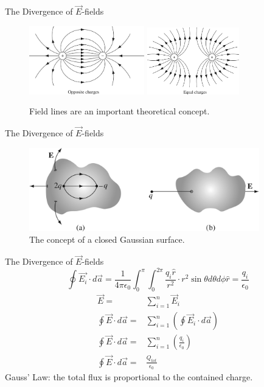 \documentclass{beamer}
\begin{document}
\begin{frame}{The Divergence of $\vec{E}$-fields}
\begin{figure}
\centering
\includegraphics[width=5cm]{figures/2_13.jpg}
\includegraphics[width=4cm]{figures/2_14.jpg}
\caption{\label{fig:fieldLines} Field lines are an important theoretical concept.}
\end{figure}
\end{frame}

\begin{frame}{The Divergence of $\vec{E}$-fields}
\begin{figure}
\centering
\includegraphics[width=10cm]{figures/2_16.jpg}
\caption{\label{fig:fieldLines2} The concept of a closed Gaussian surface.}
\end{figure}
\end{frame}

\begin{frame}{The Divergence of $\vec{E}$-fields}
\begin{equation}
\boxed{
\oint \vec{E_i} \cdot d\vec{a} = \frac{1}{4\pi \epsilon_0} \int_0^{\pi} \int_0^{2\pi} \frac{q_i\hat{r}}{r^2} \cdot r^2 \sin\theta d\theta d\phi \hat{r} = \frac{q_i}{\epsilon_0}
}
\end{equation}
\begin{align}
\vec{E} =& \sum_{i=1}^n \vec{E}_i \\
\oint \vec{E} \cdot d\vec{a} =& \sum_{i=1}^n \left(\oint \vec{E}_i \cdot d\vec{a}\right) \\
\oint \vec{E} \cdot d\vec{a} =& \sum_{i=1}^n \left( \frac{q_i}{\epsilon_0} \right) \\
\oint \vec{E} \cdot d\vec{a} =& \frac{Q_{tot}}{\epsilon_0}
\end{align}
\alert{Gauss' Law: the total flux is proportional to the contained charge.}
\end{frame}
\end{document}
